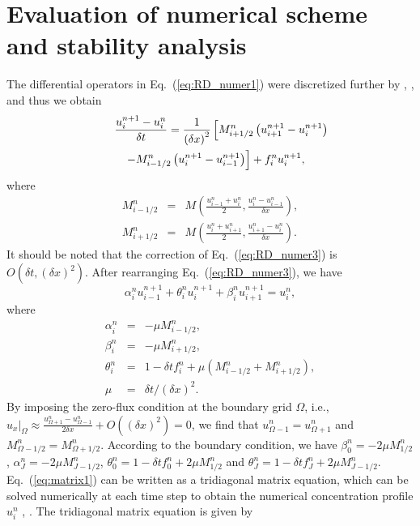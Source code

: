 \documentclass[jkps,preprint,fleqn,showpacs,showkeys]{revtex4}
\newcommand{\Eq}[1]{Eq.~(\ref{#1})}
\newcommand{\eq}[1]{Eq.~(\ref{#1})}
\newcommand{\Order}[1]{O(#1)}
\begin{document}
\section{Evaluation of numerical scheme and stability analysis \label{sec:nonstandard_scheme}}
The differential operators in \Eq{eq:RD_numer1} were discretized further by \cite{Eberl2007}, \cite{Ngamsaad2016}, and thus we obtain
\begin{eqnarray}\label{eq:RD_numer3}
\lefteqn{
\frac{u^{n+1}_i - u^{n}_i}{\delta t} = \frac{1}{\left(\delta x\right)^2} \left[M^{n}_{i+1/2}\left(u^{n+1}_{i+1}-u^{n+1}_{i}\right) \right. 
} \nonumber \\ &&
\left. - M^{n}_{i-1/2}\left(u^{n+1}_{i}-u^{n+1}_{i-1}\right)\right] 
+ f^n_i u^{n+1}_i,
\end{eqnarray}
where 
\begin{eqnarray}
M^{n}_{i-1/2} &=& M(\frac{u^{n}_{i-1}+u^{n}_{i}}{2}, \frac{u^{n}_{i}-u^{n}_{i-1}}{\delta x}), \\
M^{n}_{i+1/2} &=& M(\frac{u^{n}_{i}+u^{n}_{i+1}}{2}, \frac{u^{n}_{i+1}-u^{n}_{i}}{\delta x}).
\end{eqnarray}
It should be noted that the correction of \eq{eq:RD_numer3} is $\Order{\delta{t}, \left(\delta{x}\right)^2}$. After rearranging \eq{eq:RD_numer3}, we have
\begin{equation}\label{eq:matrix1}
\alpha^n_i u^{n+1}_{i-1} + \theta^n_i u^{n+1}_i + \beta^n_i u^{n+1}_{i+1} = u^n_i,
\end{equation}
where 
\begin{eqnarray}
\alpha^n_i &=& -\mu M^{n}_{i-1/2}, \nonumber\\
\beta^n_i &=& -\mu M^{n}_{i+1/2}, \nonumber\\
\theta^n_i &=& 1  - \delta t f^{n}_i + \mu\left(M^{n}_{i-1/2} + M^{n}_{i+1/2}\right), \nonumber\\
\mu &=& \delta t/\left(\delta x\right)^2 .
\end{eqnarray}
By imposing the zero-flux condition at the boundary grid $\Omega$, i.e., $\left. u_x \right|_\Omega \approx \frac{u^n_{\Omega+1}-u^n_{\Omega-1}}{2\delta x} + \Order{(\delta x)^2} = 0$, we find that $u^n_{\Omega-1} = u^n_{\Omega+1}$ and $M^n_{\Omega-1/2} = M^n_{\Omega+1/2}$. According to the boundary condition, we have $\beta^n_0 = -2\mu M^{n}_{1/2}$, $\alpha^n_{J} = -2\mu M^{n}_{J-1/2}$, $\theta^n_0 = 1  - \delta t f^{n}_0 + 2\mu M^{n}_{1/2}$ and $\theta^n_J = 1  - \delta t f^{n}_J + 2\mu M^{n}_{J-1/2}$. \eq{eq:matrix1} can be written as a tridiagonal matrix equation, which can be solved numerically at each time step to obtain the numerical concentration profile $u^n_i$ \cite{NumericalRecipes}, \cite{Ngamsaad2016}. The tridiagonal matrix equation is given by
\end{document}

